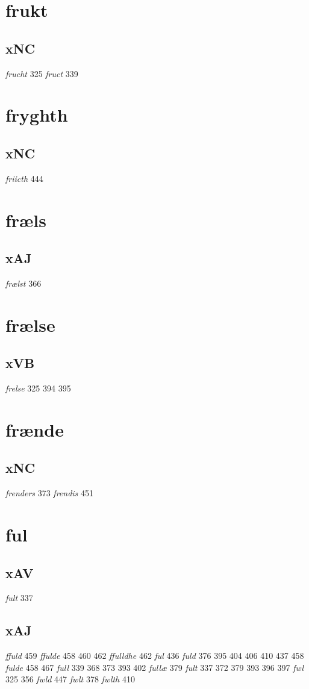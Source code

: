 \documentclass[a4paper,twocolumn]{article}
\begin{document}
\section{frukt}
\label{sec:orgfa6971d}
\subsection{xNC}
\label{sec:orgc1cc321}
\emph{frucht} 325 \emph{fruct} 339 
\section{fryghth}
\label{sec:org37f5dd1}
\subsection{xNC}
\label{sec:org4ed854d}
\emph{friicth} 444 
\section{fræls}
\label{sec:orgc4b0267}
\subsection{xAJ}
\label{sec:orgcbe222c}
\emph{frælst} 366 
\section{frælse}
\label{sec:org6ea6a16}
\subsection{xVB}
\label{sec:orgbdea730}
\emph{frelse} 325 394 395 
\section{frænde}
\label{sec:org622f05a}
\subsection{xNC}
\label{sec:orgb33a261}
\emph{frenders} 373 \emph{frendis} 451 
\section{ful}
\label{sec:orgdb3b0b9}
\subsection{xAV}
\label{sec:orgeac505a}
\emph{fult} 337 
\subsection{xAJ}
\label{sec:orgb39b160}
\emph{ffuld} 459 \emph{ffulde} 458 460 462 \emph{ffulldhe} 462 \emph{ful} 436 \emph{fuld} 376 395 404 406 410 437 458 \emph{fulde} 458 467 \emph{full} 339 368 373 393 402 \emph{fullæ} 379 \emph{fult} 337 372 379 393 396 397 \emph{fwl} 325 356 \emph{fwld} 447 \emph{fwlt} 378 \emph{fwlth} 410 
\end{document}

